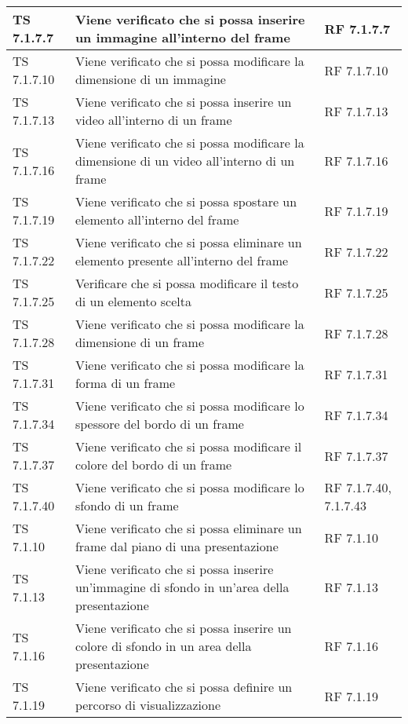 {{\begin{longtable} [c]{| p{3cm} | p{6cm} |p{3cm}|}
			\hline
			TS 7.1.7.7 & Viene verificato che si possa inserire un immagine all'interno del frame\ped{g} & RF 7.1.7.7\\
			\hline
			TS 7.1.7.10 & Viene verificato che si possa modificare la dimensione di un immagine & RF 7.1.7.10\\
			\hline
			TS 7.1.7.13 & Viene verificato che si possa inserire un video all'interno di un frame\ped{g} & RF 7.1.7.13\\
			\hline
			TS 7.1.7.16 & Viene verificato che si possa modificare la dimensione di un video all'interno di un frame\ped{g} & RF 7.1.7.16\\
			\hline
			TS 7.1.7.19 & Viene verificato che si possa spostare un elemento all'interno del frame\ped{g} & RF 7.1.7.19\\
			\hline
			TS 7.1.7.22 & Viene verificato che si possa eliminare un elemento presente all'interno del frame\ped{g} & RF 7.1.7.22 \\
			\hline
			TS 7.1.7.25 & Verificare che si possa modificare il testo di un elemento scelta\ped{g} & RF 7.1.7.25\\
			\hline
			TS 7.1.7.28 & Viene verificato che si possa modificare la dimensione di un frame\ped{g} & RF 7.1.7.28\\
			\hline
			TS 7.1.7.31 & Viene verificato che si possa modificare la forma di un frame\ped{g} & RF 7.1.7.31\\
			\hline
			TS 7.1.7.34 & Viene verificato che si possa modificare lo spessore del bordo di un frame\ped{g} & RF 7.1.7.34\\
			\hline
			TS 7.1.7.37 & Viene verificato che si possa modificare il colore del bordo di un frame\ped{g} & RF 7.1.7.37\\
			\hline
			TS 7.1.7.40 & Viene verificato che si possa modificare lo sfondo di un frame\ped{g} & RF 7.1.7.40, 7.1.7.43\\
			\hline
			TS 7.1.10 & Viene verificato che si possa eliminare un frame\ped{g} dal piano di una presentazione & RF 7.1.10\\
			\hline
			TS 7.1.13 & Viene verificato che si possa inserire un'immagine di sfondo in un'area della presentazione & RF 7.1.13 \\
			\hline
			TS 7.1.16 & Viene verificato che si possa inserire un colore di sfondo in un area della presentazione & RF 7.1.16\\
			\hline
			TS 7.1.19 & Viene verificato che si possa definire un percorso\ped{g} di visualizzazione & RF 7.1.19\\

\end{longtable}}}
